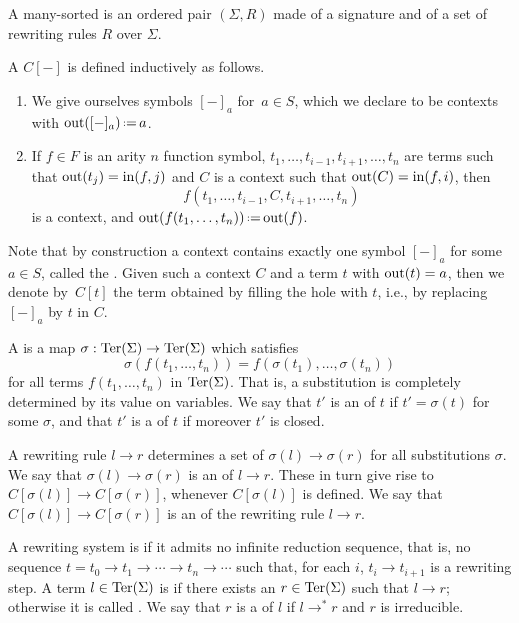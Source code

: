 \begin{definition}
  A many-sorted  is an ordered pair $(\Sigma,R)$ made of a signature and of a set of rewriting rules $R$ over $\Sigma$.
\end{definition}

A  $C[-]$ is defined inductively as follows.
\begin{enumerate}
  \item We give ourselves symbols $[-]_a$ for~$a\in S$, which we declare to be contexts with $\outsort([-]_a) \eqdef a$.
  \item If $f \in F$ is an arity $n$ function symbol, $t_1,\ldots,t_{i-1},t_{i+1},\ldots,t_n$ are terms such that $\mathrm{out}(t_j)=\mathrm{in}(f,j)$ and $C$ is a context such that $\mathrm{out}(C)=\mathrm{in}(f,i)$, then 
  $$f(t_1,\ldots,t_{i-1},C,t_{i+1},\ldots,t_n)$$
   is a context, and $\outsort(f(t_1,\ldots,t_n))\eqdef \outsort(f)$.
\end{enumerate}
Note that by construction a context contains exactly one symbol $[-]_a$ for some $a \in S$, called the .
Given such a context $C$ and a term $t$ with $\mathrm{out}(t)=a$, then we denote by~$C[t]$ the term obtained by  filling the hole with $t$, i.e., by replacing $[-]_a$ by $t$ in $C$.

A  is a map $\sigma : \mathrm{Ter}(\Sigma) \to \mathrm{Ter}(\Sigma)$ which satisfies $$\sigma(f(t_1,\ldots,t_n))=f(\sigma(t_1),\ldots,\sigma(t_n))$$ for all terms $f(t_1,\ldots,t_n)$ in $\mathrm{Ter}(\Sigma)$.
That is, a substitution is completely determined by its value on variables. We say that $t'$ is an  of $t$ if
$t'=\sigma(t)$ for some $\sigma$, and that $t'$ is a  of $t$ if moreover $t'$ is closed.


A rewriting rule $l \to r$ determines a set of  $\sigma(l)\to \sigma(r)$ for all substitutions $\sigma$. 
We say that $\sigma(l)\to \sigma(r)$ is an  of $l \to r$.
These in turn give rise to  $C[\sigma(l)] \to C[\sigma(r)]$, whenever $C[\sigma(l)]$ is defined. 
We say that $C[\sigma(l)] \to C[\sigma(r)]$ is an  of the rewriting rule $l \to r$.

A rewriting system is  if it admits  no infinite  reduction sequence, that is, no sequence $t=t_0\to t_1\to\cdots\to t_n \to\cdots$ such that, for each $i$, $t_i\to t_{i+1}$ is a rewriting step.
A term $l \in \mathrm{Ter}(\Sigma)$ is  if there exists an $r \in \mathrm{Ter}(\Sigma)$ such that $l \to r$; otherwise it is called  .
We say that $r$ is a  of $l$ if $l \to^* r$ and $r$ is irreducible.

